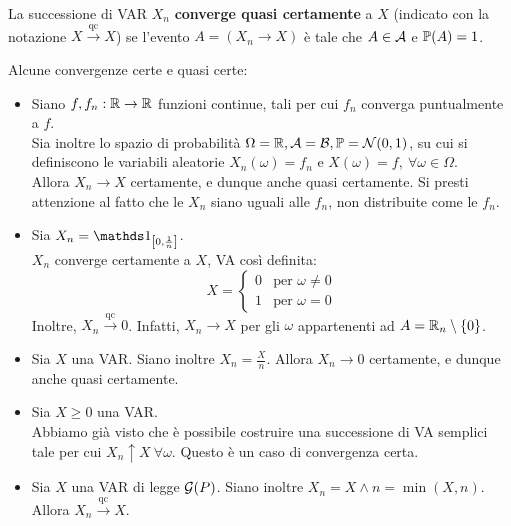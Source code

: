 \begin{defn}
    La successione di VAR $X_n$ \textbf{converge quasi certamente} a $X$ (indicato con la notazione $X \xrightarrow{\text{qc}} X$) se l'evento $A = (X_n \to X)$ è tale che $A \in \mathcal A$ e $\mathbb P(A) = 1$.
\end{defn}

\bigskip
\begin{ese} Alcune convergenze certe e quasi certe:
  \begin{itemize}
    \item Siano $f, f_n: \mathbb R \to \mathbb R$ funzioni continue, tali per cui $f_n$ converga puntualmente a $f$. \\
      Sia inoltre lo spazio di probabilità $\Omega = \mathbb R, \mathcal A = \mathcal B, \mathbb P = \mathcal N(0, 1)$, su cui si definiscono le variabili aleatorie $X_n(\omega) = f_n$ e $X(\omega) = f, \ \forall \omega \in \Omega$.\\
      Allora $X_n \to X$ certamente, e dunque anche quasi certamente. Si presti attenzione al fatto che le $X_n$ siano uguali alle $f_n$, non distribuite come le $f_n$.

    \item Sia $X_n = \Ind_{\left[0, \frac 1 n \right]}$. \\
      $X_n$ converge certamente a $X$, VA così definita:
      $$X = \begin{cases}
          0 &\text{per } \omega \neq 0 \\
          1 &\text{per } \omega = 0
      \end{cases}$$
      Inoltre, $X_n \xrightarrow{\text{qc}} 0$. Infatti, $X_n \to X$ per gli $\omega$ appartenenti ad $A = \mathbb R_n \setminus \{ 0 \}$.

    \item Sia $X$ una VAR. Siano inoltre $X_n = \frac X n$.
      Allora $X_n \to 0$ certamente, e dunque anche quasi certamente.

    \item Sia $X \ge 0$ una VAR. \\
      Abbiamo già visto che è possibile costruire una successione di VA semplici tale per cui $X_n \uparrow X \ \forall \omega$. Questo è un caso di convergenza certa.

    \item Sia $X$ una VAR di legge $\mathcal G(P)$. Siano inoltre $X_n = X \wedge n = \min(X,n)$.
      Allora $X_n \xrightarrow{\text{qc}} X$.
  \end{itemize}
\end{ese}

